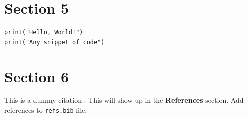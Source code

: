 \documentclass[12pt]{article}
\begin{document}
    \lipsum[3]

\section{Section 5}
    \lipsum[4]
    
    \begin{lstlisting}[caption=Code snippet in \LaTeX{} Document]
print("Hello, World!")
print("Any snippet of code")\end{lstlisting}

    \lipsum[5]

\section{Section 6}
    This is a dummy citation \cite{knuth1984}. This will show up in the \textbf{References} section. Add references to \texttt{refs.bib} file.



\end{document}
